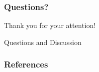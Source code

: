 \documentclass{beamer}
\begin{document}
\begin{frame}
\frametitle{Questions?}
\begin{center}
\Large Thank you for your attention!

\vspace{1cm}
Questions and Discussion
\end{center}
\end{frame}

\begin{frame}[allowframebreaks]
\frametitle{References}
\printbibliography
\end{frame}
\end{document}
